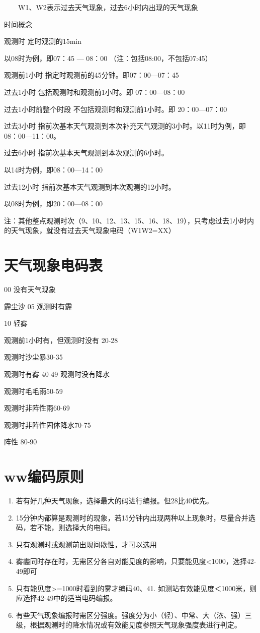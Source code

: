 ﻿\documentclass[UTF8,11pt]{ctexbook}%
\begin{document}
　　W1、W2表示过去天气现象，过去6小时内出现的天气现象

时间概念

	观测时			定时观测的15min

以08时为例，即07：45 — 08：00 （注：包括08:00，不包括07:45）

	观测前1小时	指定时观测前的45分钟。即07：00—07：45

	过去1小时		包括观测时和观测前1小时。即 07：00—08：00

	过去1小时前整个时段	不包括观测时和观测前1小时。即 20：00—07：00

	过去3小时		指前次基本天气观测到本次补充天气观测的3小时。以11时为例，即08：00—11：00。

	过去6小时		指前次基本天气观测到本次观测的6小时。

                             以14时为例，即08：00—14：00

	过去12小时		指前次基本天气观测到本次观测的12小时。

                           以08时为例，即20：00—08：00

	注：其他整点观测时次（9、10、12、13、15、16、18、19），只考虑过去1小时内的天气现象，就没有过去天气现象电码（W1W2=XX）

\section{天气现象电码表}

00 没有天气现象

霾尘沙	05	观测时有霾

		10	轻雾

观测前1小时有，但观测时没有	20-28

观测时沙尘暴30-35

观测时有雾	40-49	观测时没有降水

观测时毛毛雨50-59

观测时非阵性雨60-69

观测时非阵性固体降水70-75

阵性	80-90

\section{ww编码原则}
\begin{enumerate}
	\item 若有好几种天气现象，选择最大的码进行编报。但28比40优先。
	\item 15分钟内都算是观测时的现象，若15分钟内出现两种以上现象时，尽量合并选码，若不能，则选择大的电码。
	\item 只有观测时或观测前出现间歇性，才可以选用
	\item 雾霾同时存在时，无需区分各自对能见度的影响，只要能见度<1000，选择42-49即可
	\item 只有能见度>=1000时看到的雾才编码40、41. 如测站有效能见度＜1000米，则应选择42-49中的适当电码编报。
	\item 有些天气现象编报时需区分强度。强度分为小（轻）、中常、大（浓、强）三级，根据观测时的降水情况或有效能见度参照天气现象强度表进行判定。
\end{enumerate}
\end{document}

